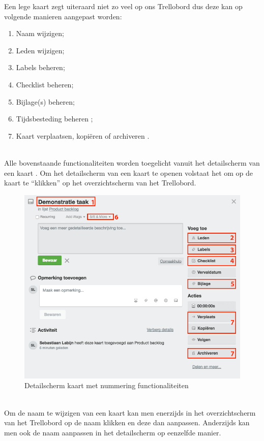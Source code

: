 Een lege kaart zegt uiteraard niet zo veel op ons Trellobord dus deze kan op volgende manieren aangepast worden:
\begin{enumerate}[nolistsep]
	\item Naam wijzigen;
	\item Leden wijzigen;
	\item Labels beheren;
	\item Checklist beheren;
	\item Bijlage(s) beheren;
	\item Tijdsbesteding beheren ;
	\item Kaart verplaatsen, kopi\"eren of archiveren .
\end{enumerate}

\noindent
\\Alle bovenstaande functionaliteiten worden toegelicht vanuit het detailscherm van een kaart . Om het detailscherm van een kaart te openen volstaat het om op de kaart te ``klikken'' op het overzichtscherm van het Trellobord.

\begin{figure}[H]
	\centering
	\includegraphics[scale=0.5]{./afbeeldingen/detail_kaart_genummerd.png}
	\caption{Detailscherm kaart met nummering functionaliteiten}
	\label{fig:detail_kaart}	
\end{figure} 

\noindent
\\
Om de naam te wijzigen van een kaart kan men enerzijds in het overzichtscherm van het Trellobord op de naam klikken en deze dan aanpassen. Anderzijds kan men ook de naam aanpassen in het detailscherm op eenzelfde manier.

